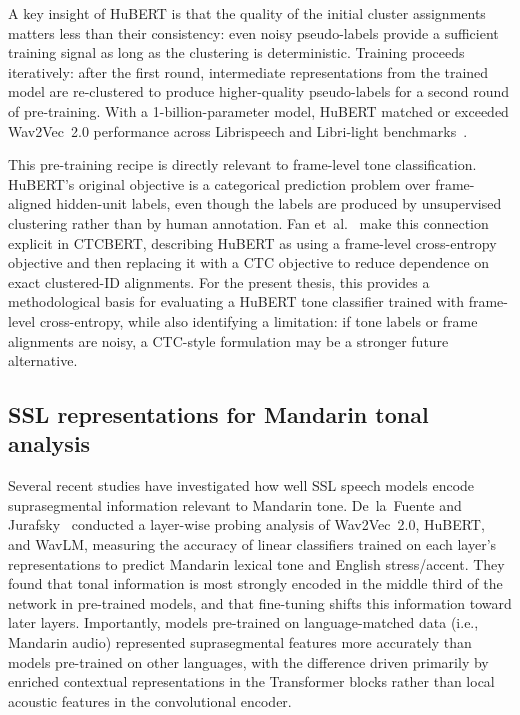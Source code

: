A key insight of HuBERT is that the quality of the initial cluster assignments matters less than their consistency: even noisy pseudo-labels provide a sufficient training signal as long as the clustering is deterministic. Training proceeds iteratively: after the first round, intermediate representations from the trained model are re-clustered to produce higher-quality pseudo-labels for a second round of pre-training. With a 1-billion-parameter model, HuBERT matched or exceeded Wav2Vec~2.0 performance across Librispeech and Libri-light benchmarks~\cite{hsu2021}.

This pre-training recipe is directly relevant to frame-level tone classification. HuBERT's original objective is a categorical prediction problem over frame-aligned hidden-unit labels, even though the labels are produced by unsupervised clustering rather than by human annotation. Fan et~al.~\cite{fan2023ctcbert} make this connection explicit in CTCBERT, describing HuBERT as using a frame-level cross-entropy objective and then replacing it with a CTC objective to reduce dependence on exact clustered-ID alignments. For the present thesis, this provides a methodological basis for evaluating a HuBERT tone classifier trained with frame-level cross-entropy, while also identifying a limitation: if tone labels or frame alignments are noisy, a CTC-style formulation may be a stronger future alternative.

\subsection{SSL representations for Mandarin tonal analysis}

Several recent studies have investigated how well SSL speech models encode suprasegmental information relevant to Mandarin tone. De~la~Fuente and Jurafsky~\cite{delafuente2024} conducted a layer-wise probing analysis of Wav2Vec~2.0, HuBERT, and WavLM, measuring the accuracy of linear classifiers trained on each layer's representations to predict Mandarin lexical tone and English stress/accent. They found that tonal information is most strongly encoded in the middle third of the network in pre-trained models, and that fine-tuning shifts this information toward later layers. Importantly, models pre-trained on language-matched data (i.e., Mandarin audio) represented suprasegmental features more accurately than models pre-trained on other languages, with the difference driven primarily by enriched contextual representations in the Transformer blocks rather than local acoustic features in the convolutional encoder.

